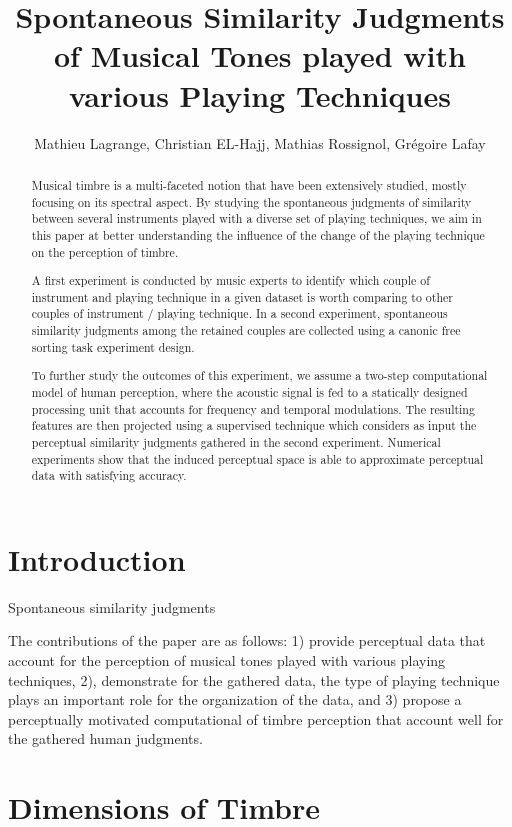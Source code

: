 \documentclass{article}
\title{Spontaneous Similarity Judgments of Musical Tones played with various Playing Techniques}
\author{Mathieu Lagrange, Christian EL-Hajj, Mathias Rossignol, Grégoire Lafay}
\begin{document}
%
\maketitle
%
\begin{abstract}

Musical timbre is a multi-faceted notion that have been extensively studied, mostly focusing on its spectral aspect. By studying the spontaneous judgments of similarity between several instruments played with a diverse set of playing techniques, we aim in this paper at better understanding the influence of the change of the playing technique on the perception of timbre.

A first experiment is conducted by music experts to identify which couple of instrument and playing technique in a given dataset is worth comparing to other couples of instrument / playing technique. In a second experiment, spontaneous similarity judgments among the retained couples are collected using a canonic free sorting task experiment design.


To further study the outcomes of this experiment, we assume a two-step computational model of human perception, where the acoustic signal is fed to a statically designed processing unit that accounts for frequency and temporal modulations. The resulting features are then projected using a supervised technique which considers as input the perceptual similarity judgments gathered in the second experiment. Numerical experiments show that the induced perceptual space is able to approximate perceptual data with satisfying accuracy.

\end{abstract}
%
\section{Introduction}\label{sec:introduction}

Spontaneous similarity judgments

The contributions of the paper are as follows: 1) provide perceptual data that account for the perception of musical tones played with various playing techniques, 2), demonstrate for the gathered data, the type of playing technique plays an important role for the organization of the data, and 3) propose a perceptually motivated computational of timbre perception that account well for the gathered human judgments.

\section{Dimensions of Timbre}\label{sec:}
\end{document}
